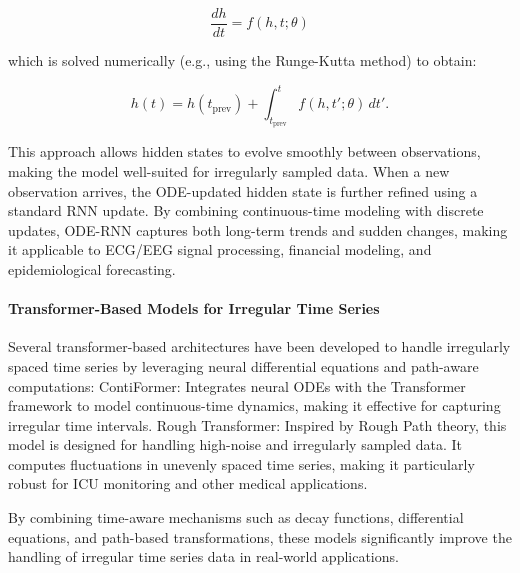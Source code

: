 \documentclass[acmsmall]{acmart}
\begin{document}
\begin{equation}
\frac{dh}{dt} = f(h, t; \theta)
\end{equation}

which is solved numerically (e.g., using the Runge-Kutta method) to obtain:

\begin{equation}
h(t) = h(t_{\text{prev}}) + \int_{t_{\text{prev}}}^{t} f(h, t'; \theta) \, dt'.
\end{equation}

This approach allows hidden states to evolve smoothly between observations, making the model well-suited for irregularly sampled data. When a new observation arrives, the ODE-updated hidden state is further refined using a standard RNN update. By combining continuous-time modeling with discrete updates, ODE-RNN captures both long-term trends and sudden changes, making it applicable to ECG/EEG signal processing, financial modeling, and epidemiological forecasting.

\paragraph{Transformer-Based Models for Irregular Time Series}Several transformer-based architectures have been developed to handle irregularly spaced time series by leveraging neural differential equations and path-aware computations:
ContiFormer: Integrates neural ODEs with the Transformer framework to model continuous-time dynamics, making it effective for capturing irregular time intervals\cite{chen2023contiformer}.
Rough Transformer: Inspired by Rough Path theory, this model is designed for handling high-noise and irregularly sampled data. It computes fluctuations in unevenly spaced time series, making it particularly robust for ICU monitoring and other medical applications.

By combining time-aware mechanisms such as decay functions, differential equations, and path-based transformations, these models significantly improve the handling of irregular time series data in real-world applications.


\end{document}
